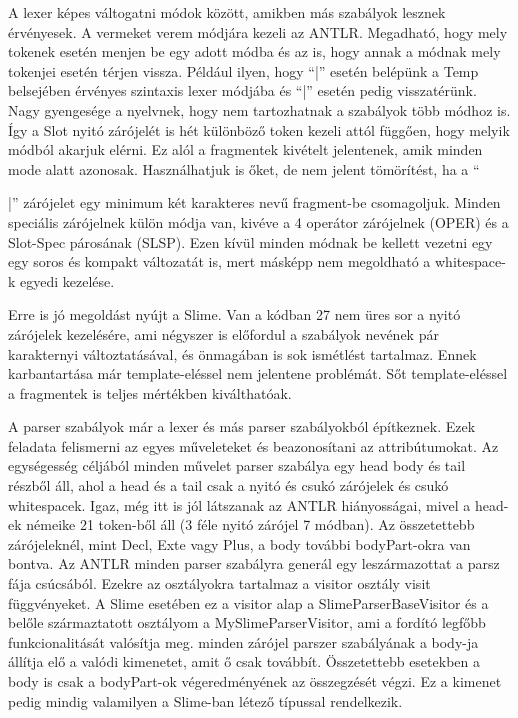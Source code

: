 A lexer képes váltogatni módok között, amikben más szabályok lesznek érvényesek. A vermeket verem módjára kezeli az ANTLR. Megadható, hogy mely tokenek esetén menjen be egy adott módba és az is, hogy annak a módnak mely tokenjei esetén térjen vissza. Például ilyen, hogy “{|” esetén belépünk a Temp belsejében érvényes szintaxis lexer módjába és “|}” esetén pedig visszatérünk. Nagy gyengesége a nyelvnek, hogy nem tartozhatnak a szabályok több módhoz is. Így a Slot nyitó zárójelét is hét különböző token kezeli attól függően, hogy melyik módból akarjuk elérni. Ez alól a fragmentek kivételt jelentenek, amik minden mode alatt azonosak. Használhatjuk is őket, de nem jelent tömörítést, ha a “{|” zárójelet egy minimum két karakteres nevű fragment-be csomagoljuk. Minden speciális zárójelnek külön módja van, kivéve a 4 operátor zárójelnek (OPER) és a Slot-Spec párosának (SLSP). Ezen kívül minden módnak be kellett vezetni egy egy soros és kompakt változatát is, mert másképp nem megoldható a whitespace-k egyedi kezelése.

Erre is jó megoldást nyújt a Slime. Van a kódban 27 nem üres sor a nyitó zárójelek kezelésére, ami négyszer is előfordul a szabályok nevének pár karakternyi változtatásával, és önmagában is sok ismétlést tartalmaz. Ennek karbantartása már template-eléssel nem jelentene problémát. Sőt template-eléssel a fragmentek is teljes mértékben kiválthatóak.

A parser szabályok már a lexer és más parser szabályokból építkeznek. Ezek feladata felismerni az egyes műveleteket és beazonosítani az attribútumokat. Az egységesség céljából minden művelet parser szabálya egy head body és tail részből áll, ahol a head és a tail csak a nyitó és csukó zárójelek és csukó whitespacek. Igaz, még itt is jól látszanak az ANTLR hiányosságai, mivel a head-ek némeike 21 token-ből áll (3 féle nyitó zárójel 7 módban). Az összetettebb zárójeleknél, mint Decl, Exte vagy Plus, a body további bodyPart-okra van bontva. Az ANTLR minden parser szabályra generál egy leszármazottat a parsz fája csúcsából. Ezekre az osztályokra tartalmaz a visitor osztály visit függvényeket. A Slime esetében ez a visitor alap a SlimeParserBaseVisitor és a belőle származtatott osztályom a MySlimeParserVisitor, ami a fordító legfőbb funkcionalitását valósítja meg. minden zárójel parszer szabályának a body-ja állítja elő a valódi kimenetet, amit ő csak továbbít. Összetettebb esetekben a body is csak a bodyPart-ok végeredményének az összegzését végzi. Ez a kimenet pedig mindig valamilyen a Slime-ban létező típussal rendelkezik.

}
